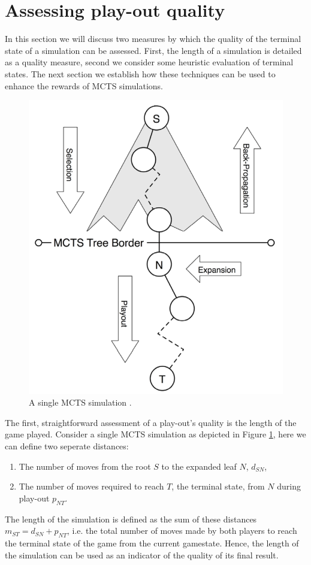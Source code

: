 \documentclass{ecai2010}
\begin{document}
\section{Assessing play-out quality}
\label{sec:poqual}

In this section we will discuss two measures by which the quality of the terminal state of a simulation can be assessed. First, the length of a simulation is detailed as a quality measure, second we consider some heuristic evaluation of terminal states. The next section we establish how these techniques can be used to enhance the rewards of MCTS simulations.

\begin{figure}[ht]
	\centering
	\includegraphics[width=.3\textwidth]{img/figure2.png}
	\caption{A single MCTS simulation \cite{finnsson2010learning}.}
	\label{fig:mcts-simulation}
\end{figure}

The first, straightforward assessment of a play-out's quality is the length of the game played. Consider a single MCTS simulation as depicted in Figure \ref{fig:mcts-simulation}, here we can define two seperate distances: 
\begin{enumerate}
\item The number of moves from the root $S$ to the expanded leaf $N$, $d_{SN}$,
\item The number of moves required to reach $T$, the terminal state, from $N$ during play-out $p_{NT}$.
\end{enumerate}
The length of the simulation is defined as the sum of these distances $m_{ST} = d_{SN} + p_{NT}$, i.e. the total number of moves made by both players to reach the terminal state of the game from the current gamestate. Hence, the length of the simulation can be used as an indicator of the quality of its final result.
\end{document}
